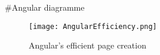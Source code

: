 
#Angular diagramme

\begin{figure}
	\centering
	\texttt{[image: AngularEfficiency.png]}
	\caption{Angular's efficient page creation}
	\label{fig:length_eight_mouse}
\end{figure}